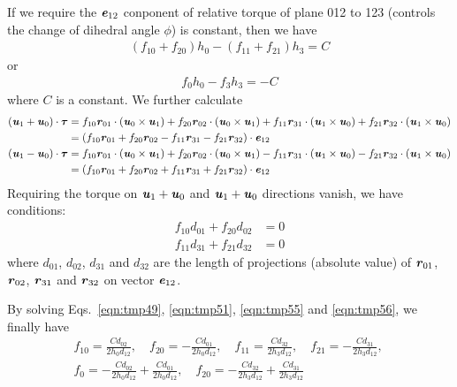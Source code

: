 \documentclass[aip,jcp,a4paper,reprint,onecolumn]{revtex4-1}
\newcommand{\vect}[1]{\textbf{\textit{#1}}}
\begin{document}
If we require the $\vect e_{12}$ conponent of relative torque of plane
012 to 123 (controls the change of dihedral angle $\phi$) is constant, then we have
\begin{align}\label{eqn:tmp51}
  (f_{10} + f_{20}) h_0 - (f_{11} + f_{21}) h_3 = C
\end{align}
or
\begin{align}
  f_0h_0 - f_3h_3 = -C
\end{align}
where $C$ is a constant.
We further calculate
\begin{align}\nonumber
  (\vect u_1 + \vect u_0) \cdot\boldsymbol\tau
  &=
  f_{10} \vect r_{01}\cdot(\vect u_0\times\vect u_{1}) + 
  f_{20} \vect r_{02}\cdot(\vect u_0\times\vect u_{1}) + 
  f_{11} \vect r_{31}\cdot(\vect u_1\times\vect u_{0}) + 
  f_{21} \vect r_{32}\cdot(\vect u_1\times\vect u_{0})  \\
  &  =
  (f_{10} \vect r_{01} + f_{20} \vect r_{02} - f_{11} \vect r_{31} - f_{21} \vect r_{32}) \cdot \vect e_{12} \\\nonumber
  (\vect u_1 - \vect u_0) \cdot\boldsymbol\tau
  &=
  f_{10} \vect r_{01}\cdot(\vect u_0\times\vect u_{1}) + 
  f_{20} \vect r_{02}\cdot(\vect u_0\times\vect u_{1}) - 
  f_{11} \vect r_{31}\cdot(\vect u_1\times\vect u_{0}) -
  f_{21} \vect r_{32}\cdot(\vect u_1\times\vect u_{0})  \\
  &  =
  (f_{10} \vect r_{01} + f_{20} \vect r_{02} + f_{11} \vect r_{31} + f_{21} \vect r_{32}) \cdot \vect e_{12} 
\end{align}
Requiring the torque on $\vect u_1 + \vect u_0$ and $\vect u_1 + \vect
u_0$ directions vanish, we have conditions:
\begin{align}\label{eqn:tmp55}
  f_{10} d_{01} + f_{20} d_{02} &= 0\\\label{eqn:tmp56}
  f_{11} d_{31} + f_{21} d_{32} &= 0
\end{align}
where $d_{01}$, $d_{02}$, $d_{31}$ and $d_{32}$ are the length of
projections (absolute value) of $\vect r_{01}$, $\vect r_{02}$, $\vect
r_{31}$ and $\vect r_{32}$ on vector $\vect e_{12}$.

By solving Eqs.~\eqref{eqn:tmp49}, \eqref{eqn:tmp51},
\eqref{eqn:tmp55} and \eqref{eqn:tmp56}, we finally have
\begin{align}
  &f_{10} = \frac{C d_{02}}{2h_0 d_{12}}, \quad f_{20} = -\frac{C d_{01}}{2h_0 d_{12}},\quad
  f_{11} = \frac{C d_{32}}{2h_3 d_{12}}, \quad f_{21} = -\frac{C d_{31}}{2h_3 d_{12}},\quad\\
  &f_{0} = - \frac{C d_{02}}{2h_0 d_{12}} + \frac{C d_{01}}{2h_0 d_{12}}, \quad
  f_{20} = - \frac{C d_{32}}{2h_3 d_{12}} + \frac{C d_{31}}{2h_3 d_{12}}
\end{align}
\end{document}
